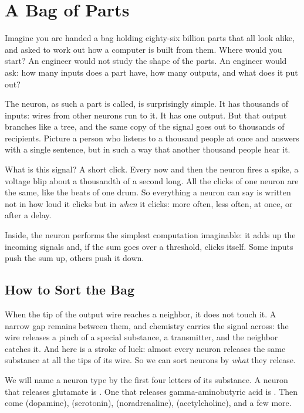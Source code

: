 \chapter{A Bag of Parts}


Imagine you are handed a bag holding eighty-six billion parts that all look alike, and asked to work out how a computer is built from them. Where would you start? An engineer would not study the shape of the parts. An engineer would ask: how many inputs does a part have, how many outputs, and what does it put out?

The neuron, as such a part is called, is surprisingly simple. It has thousands of inputs: wires from other neurons run to it. It has one output. But that output branches like a tree, and the same copy of the signal goes out to thousands of recipients. Picture a person who listens to a thousand people at once and answers with a single sentence, but in such a way that another thousand people hear it.

What is this signal? A short click. Every now and then the neuron fires a spike, a voltage blip about a thousandth of a second long. All the clicks of one neuron are the same, like the beats of one drum. So everything a neuron can say is written not in how loud it clicks but in \emph{when} it clicks: more often, less often, at once, or after a delay.

Inside, the neuron performs the simplest computation imaginable: it adds up the incoming signals and, if the sum goes over a threshold, clicks itself. Some inputs push the sum up, others push it down.

\section*{How to Sort the Bag}

When the tip of the output wire reaches a neighbor, it does not touch it. A narrow gap remains between them, and chemistry carries the signal across: the wire releases a pinch of a special substance, a transmitter, and the neighbor catches it. And here is a stroke of luck: almost every neuron releases the same substance at all the tips of its wire. So we can sort neurons by \emph{what} they release.

We will name a neuron type by the first four letters of its substance. A neuron that releases glutamate is . One that releases gamma-aminobutyric acid is . Then come  (dopamine),  (serotonin),  (noradrenaline),  (acetylcholine), and a few more.

